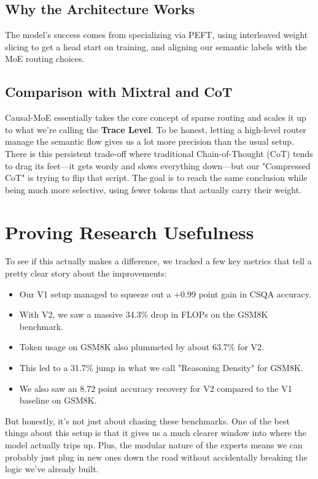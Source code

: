 \documentclass[conference,compsoc]{IEEEtran}
\begin{document}
\subsection{Why the Architecture Works}
The model's success comes from specializing via PEFT, using interleaved weight slicing to get a head start on training, and aligning our semantic labels with the MoE routing choices.

\subsection{Comparison with Mixtral and CoT}
Causal-MoE essentially takes the core concept of sparse routing and scales it up to what we’re calling the \textbf{Trace Level}. To be honest, letting a high-level router manage the semantic flow gives us a lot more precision than the usual setup. There is this persistent trade-off where traditional Chain-of-Thought (CoT) tends to drag its feet—it gets wordy and slows everything down—but our "Compressed CoT" is trying to flip that script. The goal is to reach the same conclusion while being much more selective, using fewer tokens that actually carry their weight.

\section{Proving Research Usefulness}
To see if this actually makes a difference, we tracked a few key metrics that tell a pretty clear story about the improvements:
\begin{itemize}
    \item Our V1 setup managed to squeeze out a +0.99 point gain in CSQA accuracy.
    \item With V2, we saw a massive 34.3\% drop in FLOPs on the GSM8K benchmark.
    \item Token usage on GSM8K also plummeted by about 63.7\% for V2.
    \item This led to a 31.7\% jump in what we call "Reasoning Density" for GSM8K.
    \item We also saw an 8.72 point accuracy recovery for V2 compared to the V1 baseline on GSM8K.
\end{itemize}
But honestly, it’s not just about chasing these benchmarks. One of the best things about this setup is that it gives us a much clearer window into where the model actually trips up. Plus, the modular nature of the experts means we can probably just plug in new ones down the road without accidentally breaking the logic we’ve already built.
\end{document}
